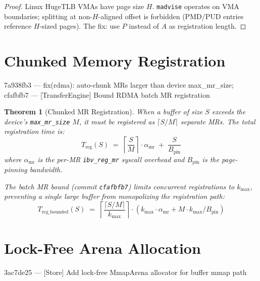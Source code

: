 \documentclass[11pt,a4paper,twoside]{article}
\theoremstyle{plain}
\newtheorem{theorem}{Theorem}[section]
\theoremstyle{definition}
\theoremstyle{remark}
\begin{document}
\begin{proof}
Linux HugeTLB VMAs have page size $H$. \texttt{madvise} operates on VMA boundaries;
splitting at non-$H$-aligned offset is forbidden (PMD/PUD entries reference $H$-sized
pages). The fix: use $P$ instead of $A$ as registration length.
\end{proof}


\section{Chunked Memory Registration}
\label{sec:chunked-mr}

\begin{commitbox}{7a938fb3 --- fix(rdma): auto-chunk MRs larger than device max\_mr\_size;
cfafbfb7 --- [TransferEngine] Bound RDMA batch MR registration}
\end{commitbox}

\begin{theorem}[Chunked MR Registration]
\label{thm:chunked-mr}
When a buffer of size $S$ exceeds the device's \texttt{max\_mr\_size} $M$, it must be
registered as $\lceil S/M \rceil$ separate MRs. The total registration time is:
\begin{equation}
  T_{\text{reg}}(S) \;=\; \left\lceil \frac{S}{M} \right\rceil \cdot \alpha_{\text{mr}}
  \;+\; \frac{S}{B_{\text{pin}}}
\end{equation}
where $\alpha_{\text{mr}}$ is the per-MR \texttt{ibv\_reg\_mr} syscall overhead and
$B_{\text{pin}}$ is the page-pinning bandwidth.

The batch MR bound (commit \texttt{cfafbfb7}) limits concurrent registrations to
$k_{\text{max}}$, preventing a single large buffer from monopolizing the registration path:
\begin{equation}
  T_{\text{reg\_bounded}}(S) \;=\;
  \left\lceil \frac{\lceil S/M \rceil}{k_{\text{max}}} \right\rceil
  \cdot (k_{\text{max}} \cdot \alpha_{\text{mr}} + M \cdot k_{\text{max}} / B_{\text{pin}})
\end{equation}
\end{theorem}


\section{Lock-Free Arena Allocation}
\label{sec:lock-free-arena}

\begin{commitbox}{3ac7de25 --- [Store] Add lock-free MmapArena allocator for buffer mmap path}
\end{commitbox}
\end{document}
